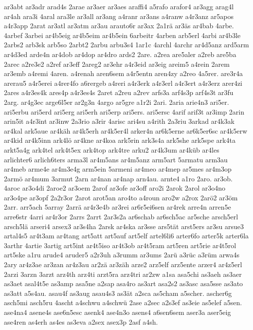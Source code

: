 {ar3abt
ar3adr
arad4s
2arae
ar3aer
ar3aes
araffi4
a5rafo
arafor4
ar3agg
arag4l
ar4ah
ara3i
4aral
ara3le
ar3all
ar3ang
a4ranr
ar3ans
a4ranw
a4r3anz
ar5apos
a4r3app
2arat
ar3atl
ar3atm
ar3au
arauto6r
ar3ax
2a1rä
ar3äs
ar4bab
4arbe.
4arbef
3arbei
ar4b5eig
ar4b5eim
ar4b5ein
6arbeitr
4arben
arb5erl
4arbi
ar4b3le
2arbs2
arb3sk
arb5so
2arbt2
2arbu
arbu3s4
1ar1c
4archl
4archr
ar4d5anz
ard5arm
ar4d3ed
arde4n
ar4dob
ar4dop
ar4dro
ards2
2are.
a2rea
are5aler
a2reb
are5ba
2arec
a2re3e2
a2ref
ar3eff
2areg2
ar3ehr
a4r3eid
ar3eig
areim5
a4rein
2arem
ar3emb
a4remi
4aren.
a4renah
aren6sem
a4r5entn
aren4zy
a2reo
4a5rer.
are3r4a
arerau5
a4r5erei
a4rer4fo
a6rergeb
a4reri
a4r3erk
a4r3erl
a4r3ert
a4r3erz
arer4zi
2ares
a4r3es4k
ares4p
a4r3es4s
2aret
a2reu
a2rev
arfs3a
arf4s3p
arf4s3t
ar3fu
2arg.
ar4g3ec
arge6l5er
ar2g3n
4argo
ar5gre
a1r2i
2ari.
2aria
arie4n3
ari5er.
ari5erbu
ari5erd
ari5erg
ari5erh
ari5erp
ari5ers.
ari5ersc
4arif
arif3t
ar3imp
2arin
arin5it
a4r3int
ar3inw
2a3rio
a3rir
4arisc
ari4su
a4rith
2a3riu
3arkad
ar4k3ak
ar4kal
ark5aue
ar4käh
ar4k5erh
ar4k5er4l
arker4n
ar6k5erne
ar6k5er6sc
ar4k5erw
ar4kid
ar4k5inn
ark4lö
ar4kne
ar4koa
ark5rin
ark3s4a
ark5she
ark5spe
ark4ta
arkt5a4g
ark4tel
ark4t5ex
ark4top
ark4tre
arku2
ar4k3um
ar4küb
ar4les
arlichter6
arlich6ters
arma3l
ar4m5ans
ar4m5anz
arm5art
5armatu
arm3au
ar4meb
arme4e
ar4m3e4g
arm5ein
5armeni
ar4meo
ar4mep
ar5mes
ar4m3op
2armö
ar4mum
3armut
2arn
ar4nan
ar4nap
arn4au.
arnte4
a1ro
2aro.
ar3ob.
4aroc
ar3o4di
2aroe2
ar3oem
2arof
ar3ofe
ar3off
aro2i
2arok
2arol
ar3o4no
ar3o4pe
ar3opf
2a2r3or
2arot
arot5an
aro4to
a4roun
aro2w
a2rox
2arö2
ar3öm
2arr.
arr5ach
5array
2arrä
ar4r3e4b
ar3rei
ar6r5ei6sen
ar4rek
arre4n
arren5e
arre6str
4arri
ar4r3or
2arrs
2arrt
2ar3s2a
ar6schab
ar6sch5ac
ar5sche
arsch5erl
arsch5lä
arseri4
arsex3
ar3s4ha
2arsk
ar4ska
ar3sse
ars5tät
arst5ers
ar3su
arsue3
artal4s5
ar4t3am
ar4tang
art5att
art5auf
art5elf
artel6li6
arter6fo
arter5k
arter6la
3arthr
4artie
3artig
art5int
ar4t5iso
ar4t3ob
ar4t5ram
art5ren
art5rie
ar4t5rol
art5ske
a1ru
arude4
aruder5
a2r3uh
a3rumm
ar3ums
2arü
a3rüc
a3rüm
arwa4s
2ary
ar4z3ae
ar3zan
ar4z3au
ar2zä
ar3zäh
arze2
arz5elf
arz5ente
arzer4
ar4z5erl
2arzi
3arzn
3arzt
arz4th
arz4ti
arzt5ra
arz4tri
ar2zw
a1sa
asa5chi
as3aeh
as3aer
as3aet
asal4t5e
as3amp
asa5ne
a2sap
asa4ro
as3art
asa2s2
as3asc
asa5sse
as3ato
as3att
a5s4au.
asau4f
as3aug
asau4s3
as3ät
a2sca
as5cham
a5scher.
ascher6g
asch5mi
asch5ru
4ascht
a4schwu
a4schwü
2ase
a2sec
a2s3ef
as3eie
as5elef
a5sen.
ase4na4
asene4s
ase6n5esc
asenk4
ase4n3o
asens4
a6sen6sem
aser3a
aser5eig
ase4ren
as4erh
as4es
as3eva
a2sex
asex3p
2asf
a4sh.
}
